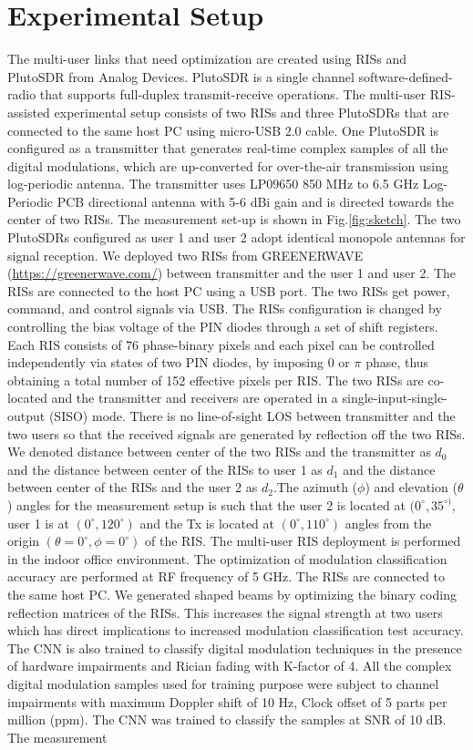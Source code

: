\documentclass[summary]{ursi}
\begin{document}
\section{Experimental Setup}
The multi-user links that need optimization are created using RISs and PlutoSDR from Analog Devices. PlutoSDR is a single channel software-defined-radio that supports full-duplex transmit-receive operations. The multi-user RIS-assisted experimental setup consists of two RISs and three PlutoSDRs that are connected to the same host PC using micro-USB 2.0 cable. One PlutoSDR is configured as a transmitter that generates real-time complex samples of all the digital modulations, which are up-converted for over-the-air transmission using log-periodic antenna. The transmitter uses LP09650 850 MHz to 6.5 GHz Log-Periodic PCB directional antenna with 5-6 dBi gain and is directed towards the center of two RISs. The measurement set-up is shown in Fig.\ref{fig:sketch}. The two PlutoSDRs configured as user 1 and user 2 adopt identical monopole antennas for signal reception. We deployed two RISs from GREENERWAVE \mbox{(\url{https://greenerwave.com/})} between transmitter and the user 1 and user 2. The RISs are connected to the host PC using a USB port. The two RISs get power, command, and control signals via USB. The RISs configuration is changed by controlling the bias voltage of the PIN diodes through a set of shift registers. Each RIS consists of 76 phase-binary pixels \cite{kaina2014hybridized} and each pixel can be controlled independently via states of two PIN diodes, by imposing 0 or $\pi$ phase, thus obtaining a total number of 152 effective pixels per RIS. The two RISs are co-located and the transmitter and receivers are operated in a single-input-single-output (SISO) mode. There is no line-of-sight LOS between transmitter and the two users so that the received signals are generated by reflection off the two RISs. We denoted distance between center of the two RISs and the transmitter as $d_0$ and the distance between center of the RISs to user 1 as $d_1$ and the distance between center of the RISs and the user 2 as $d_2$.The azimuth ($\phi$) and elevation ($\theta$) angles for the measurement setup is such that the user 2 is located at $(0^{\circ},35^{\circ)}$, user 1 is at $(0^{\circ},120^{\circ})$ and the Tx is located at $(0^{\circ},110^{\circ})$ angles from the origin $(\theta=0^{\circ},\phi=0^{\circ})$ of the RIS. The multi-user RIS deployment is performed in the indoor office environment. The optimization of modulation classification accuracy are performed at RF frequency of 5 GHz. The RISs are connected to the same host PC. We generated shaped beams by optimizing the binary coding reflection matrices of the RISs. This increases the signal strength at two users which has direct implications to increased modulation classification test accuracy. The CNN is also trained to classify digital modulation techniques in the presence of hardware impairments and Rician fading with K-factor of 4. All the complex digital modulation samples used for training purpose were subject to channel impairments with maximum Doppler shift of 10 Hz, Clock offset of 5 parts per million (ppm). The CNN was trained to classify the samples at SNR of 10 dB. The measurement 
\end{document}
